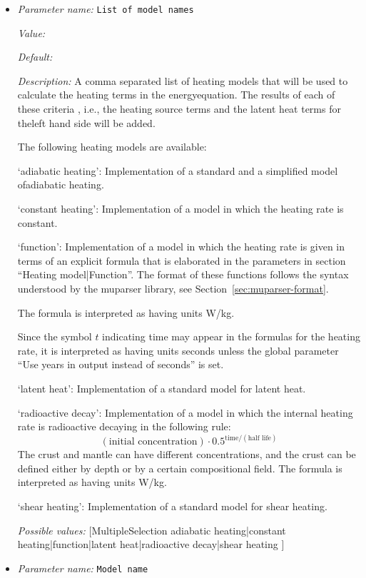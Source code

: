 \begin{itemize}
\item {\it Parameter name:} {\tt List of model names}
\label{parameters:Heating model/List of model names}


{\it Value:} 


{\it Default:} 


{\it Description:} A comma separated list of heating models that will be used to calculate the heating terms in the energyequation. The results of each of these criteria , i.e., the heating source terms and the latent heat terms for theleft hand side will be added.

The following heating models are available:

`adiabatic heating': Implementation of a standard and a simplified model ofadiabatic heating.

`constant heating': Implementation of a model in which the heating rate is constant.

`function': Implementation of a model in which the heating rate is given in terms of an explicit formula that is elaborated in the parameters in section ``Heating model|Function''. The format of these functions follows the syntax understood by the muparser library, see Section~\ref{sec:muparser-format}.

The formula is interpreted as having units W/kg.

Since the symbol $t$ indicating time may appear in the formulas for the heating rate, it is interpreted as having units seconds unless the global parameter ``Use years in output instead of seconds'' is set.

`latent heat': Implementation of a standard model for latent heat.

`radioactive decay': Implementation of a model in which the internal heating rate is radioactive decaying in the following rule:
\[(\text{initial concentration})\cdot 0.5^{\text{time}/(\text{half life})}\]
The crust and mantle can have different concentrations, and the crust can be defined either by depth or by a certain compositional field.
The formula is interpreted as having units W/kg.

`shear heating': Implementation of a standard model for shear heating.


{\it Possible values:} [MultipleSelection adiabatic heating|constant heating|function|latent heat|radioactive decay|shear heating ]
\item {\it Parameter name:} {\tt Model name}
\label{parameters:Heating model/Model name}



\end{itemize}
